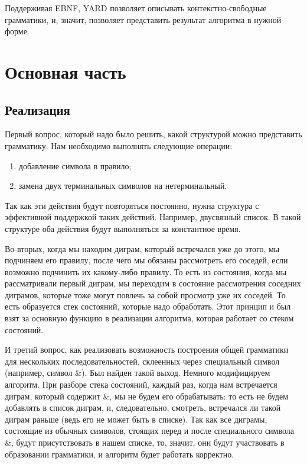 \documentclass[14pt]{matmex-diploma}
\begin{document}
	    Поддерживая EBNF, YARD позволяет описывать контекстно-свободные грамматики, и, значит, позволяет представить результат алгоритма в нужной форме.

\section{Основная часть}

    \subsection{Реализация}
        Первый вопрос, который надо было решить, какой структурой можно представить грамматику. Нам необходимо выполнять следующие операции:
    \begin{enumerate}
        \item добавление символа в правило;
        \item замена двух терминальных символов на нетерминальный.
    \end{enumerate}
    Так как эти действия будут повторяться постоянно, нужна структура с эффективной поддержкой таких действий. Например, двусвязный список. В такой структуре оба действия будут выполняться за константное время.
    
    Во-вторых, когда мы находим диграм, который встречался уже до этого, мы подчиняем его правилу, после чего мы обязаны рассмотреть его соседей, если возможно подчинить их какому-либо правилу. То есть из состояния, когда мы рассматривали первый диграм, мы переходим в состояние рассмотрения соседних диграмов, которые тоже могут повлечь за собой просмотр уже их соседей. То есть образуется стек состояний, которые надо обработать. Этот принцип и был взят за основную функцию в реализации алгоритма, которая работает со стеком состояний.
    
    И третий вопрос, как реализовать возможность построения общей грамматики для нескольких последовательностей, склеенных через специальный символ (например, символ \&). Был найден такой выход.  Немного модифицируем алгоритм.
    При разборе стека состояний, каждый раз, когда нам встречается диграм, который содержит \&, мы не будем его обрабатывать: то есть не будем добавлять в список диграм, и, следовательно, смотреть, встречался ли такой диграм раньше (ведь его не может быть в списке). 
    Так как все диграмы, состоящие из обычных символов, стоящих перед и после специального символа \&, будут присутствовать в нашем списке, то, значит, они будут участвовать в образовании грамматики, и алгоритм будет работать корректно.
    
\end{document}
